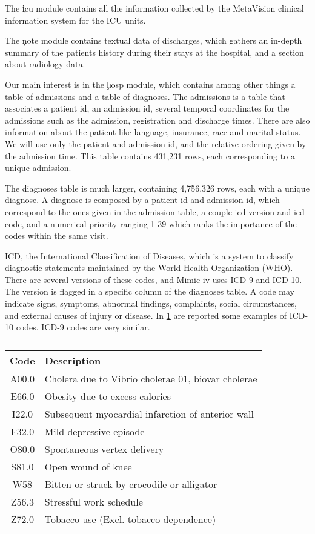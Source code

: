 \documentclass[]{marticle}
\begin{document}
The \c{icu} module contains all the information collected by the MetaVision clinical information
system for the ICU units.

The \c{note} module contains textual data of discharges, which gathers an in-depth summary of the
patients history during their stays at the hospital, and a section about radiology data.

Our main interest is in the \c{hosp} module, which contains among other things a table of admissions
and a table of diagnoses. The admissions is a table that associates a patient id, an admission id,
several temporal coordinates for the admissions such as the admission, registration and discharge
times. There are also information about the patient like language, insurance, race and marital
status. We will use only the patient and admission id, and the relative ordering given by the
admission time. This table contains 431,231 rows, each corresponding to a unique admission. 

The diagnoses table is much larger, containing 4,756,326 rows, each with a unique diagnose. A
diagnose is composed by a patient id and admission id, which correspond to the ones given in the
admission table, a couple icd-version and icd-code, and a numerical priority ranging 1-39 which
ranks the importance of the codes within the same visit.

ICD, the International Classification of Diseases, which is a system to classify diagnostic
statements maintained by the World Health Organization (WHO). There are several versions of these
codes, and Mimic-iv uses ICD-9 and ICD-10. The version is flagged in a specific column of the
diagnoses table. A code may indicate signs, symptoms, abnormal findings, complaints, social
circumstances, and external causes of injury or disease. In \ref{table:icd_examples} are reported some examples
of ICD-10 codes. ICD-9 codes are very similar.

\begin{table}[h]
\begin{center}
\begin{tabular}{  c  l  }
    \hline
    Code & Description \\ 
    \hline
    A00.0 & Cholera due to Vibrio cholerae 01, biovar cholerae \\ 
    E66.0 & Obesity due to excess calories \\ 
    I22.0 & Subsequent myocardial infarction of anterior wall \\ 
    F32.0 & Mild depressive episode \\ 
    O80.0 & Spontaneous vertex delivery \\ 
    S81.0 & Open wound of knee \\ 
    W58   & Bitten or struck by crocodile or alligator \\ 
    Z56.3 & Stressful work schedule \\ 
    Z72.0 & Tobacco use (Excl. tobacco dependence) \\ 
    \hline
\end{tabular}
\caption{}
\label{table:icd_examples}
\end{center}
\end{table}
\end{document}
